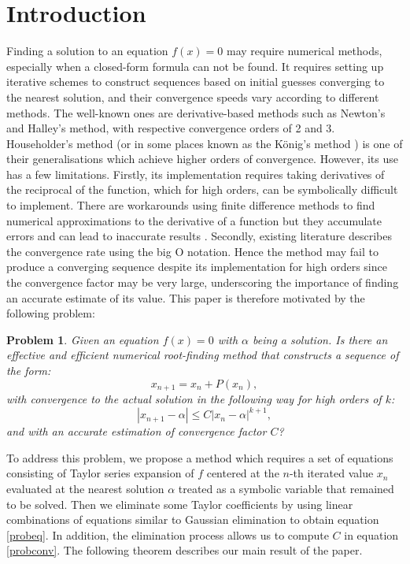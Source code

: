 \documentclass{article}
\newtheorem{problem}{Problem}[section]
\begin{document}
\section{Introduction}\label{sec1}
Finding a solution to an equation $f(x)=0$ may require numerical methods, especially when a closed-form formula can not be found. It requires setting up iterative schemes to construct sequences based on initial guesses converging to the nearest solution, and their convergence speeds vary according to different methods. The well-known ones are derivative-based methods such as Newton's and Halley's method, with respective convergence orders of 2 and 3. Householder's method \cite{Householder-1970,Pascal-Xavier-21,Breuer-Zwas-1984} (or in some places known as the K\"onig's method \cite{ABD-1997, Buff-Henriksen-2003, McNamee-2007}) is one of their generalisations which achieve higher orders of convergence. However, its use has a few limitations. Firstly, its implementation requires taking derivatives of the reciprocal of the function, which for high orders, can be symbolically difficult to implement. There are workarounds using finite difference methods to find numerical approximations to the derivative of a function but they accumulate errors and can lead to inaccurate results  \cite{GRS-2007, Krasny-2025}. Secondly, existing literature describes the convergence rate using the big O notation. Hence the method may fail to produce a converging sequence despite its implementation for high orders since the convergence factor may be very large, underscoring the importance of finding an accurate estimate of its value. This paper is therefore motivated by the following problem: 
\medskip
\begin{problem}
Given an equation $f(x)=0$ with $\alpha$ being a solution. Is there an effective and efficient numerical root-finding method that constructs a sequence of the form:
\begin{equation}\label{probeq}
x_{n+1}=x_{n}+P(x_{n}),
\end{equation}
with convergence to the actual solution in the following way for high orders of $k$:
\begin{equation}\label{probconv}
|x_{n+1}-\alpha|\leq C|x_{n}-\alpha|^{k+1},
\end{equation}
and with an accurate estimation of convergence factor $C$?
\end{problem}
\medskip
To address this problem, we propose a method which requires a set of equations consisting of Taylor series expansion of $f$ centered at the $n$-th iterated value $x_{n}$ evaluated at the nearest solution $\alpha$ treated as a symbolic variable that remained to be solved. Then we eliminate some Taylor coefficients by using linear combinations of equations similar to Gaussian elimination to obtain equation \eqref{probeq}. In addition, the elimination process  allows us to compute $C$ in equation \eqref{probconv}. The following theorem describes our main result of the paper. 
\medskip
\end{document}
